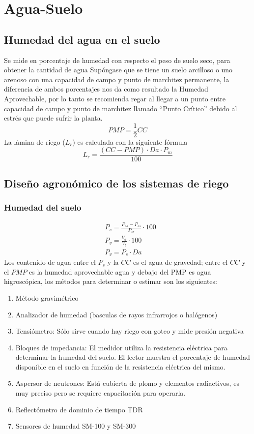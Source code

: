 \section{Agua-Suelo}
\subsection{Humedad del agua en el suelo}
Se mide en porcentaje de humedad con respecto el peso de suelo seco, para obtener la cantidad de agua
Supóngase que se tiene un suelo arcilloso o uno arenoso con una capacidad de campo y punto de marchitez permanente,
la diferencia de ambos porcentajes nos da como resultado la Humedad Aprovechable, por lo tanto se recomienda regar al llegar a un
punto entre capacidad de campo y punto de marchitez llamado ``Punto Crítico'' debido al estrés que puede sufrir la planta.
\begin{equation}
    PMP = \frac{1}{2}CC
\end{equation}
La lámina de riego ($L_r$) es calculada con la siguiente fórmula
\begin{equation}
    L_r = \frac{\left(CC - PMP\right) \cdot Da \cdot P_m}{100}
\end{equation}
\subsection{Diseño agronómico de los sistemas de riego}
\subsubsection{Humedad del suelo}
\begin{align}
    &P_s =\frac{P_{sh} - P_{ss}}{P_{ss}} \cdot 100\\
    &P_v =\frac{V_a}{V_t} \cdot 100\\
    &P_v = P_s \cdot Da
\end{align}
Los contenido de agua entre el $P_s$ y la $CC$ es el agua de gravedad; entre el $CC$ y el $PMP$ es la humedad aprovechable agua y debajo del PMP es agua higroscópica, los métodos para determinar o estimar son los siguientes:
\begin{enumerate}
    \item Método gravimétrico
    \item Analizador de humedad (basculas de rayos infrarrojos o halógenos)
    \item Tensiómetro: Sólo sirve cuando hay riego con goteo y mide presión negativa
    \item Bloques de impedancia: El medidor utiliza la resistencia eléctrica para determinar la humedad del suelo. El lector muestra el porcentaje de humedad disponible en el suelo en función de la resistencia eléctrica del mismo.
    \item Aspersor de neutrones: Está cubierta de plomo y elementos radiactivos, es muy preciso pero se requiere capacitación para operarla.
    \item Reflectómetro de dominio de tiempo TDR
    \item Sensores de humedad SM-100 y SM-300
\end{enumerate}

